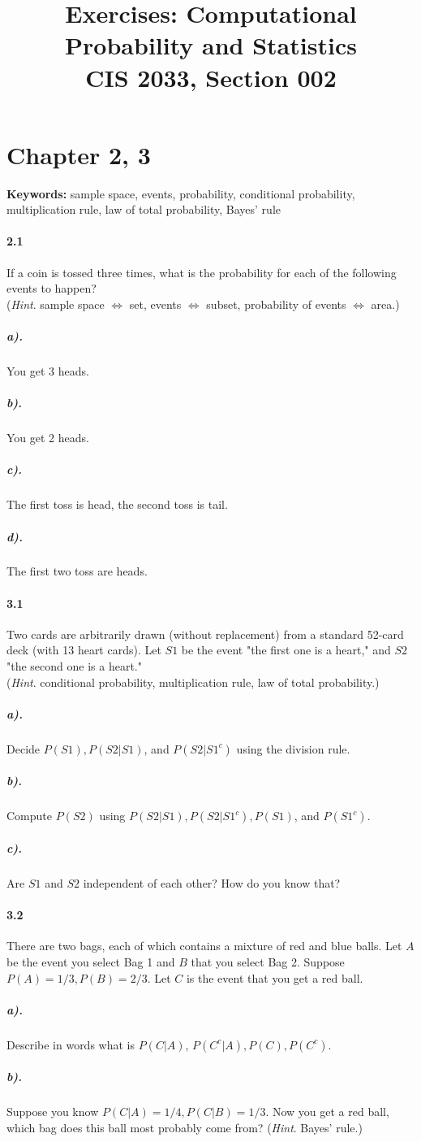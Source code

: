 \documentclass[11pt]{article} %
\title{Exercises: Computational Probability and Statistics \\
CIS 2033, Section 002}
\begin{document}
\maketitle
\section{Chapter 2, 3}
\textbf{Keywords:} sample space, events, probability, conditional probability, multiplication rule, law of total probability, Bayes' rule
\paragraph*{2.1} If a coin is tossed three times, what is the probability for each of the following events to happen?\\
(\textit{Hint}. sample space $\Leftrightarrow$ set, events $\Leftrightarrow$ subset, probability of events $\Leftrightarrow$ area.)
\subparagraph*{a).} You get 3 heads.
\subparagraph*{b).} You get 2 heads.
\subparagraph*{c).} The first toss is head, the second toss is tail.
\subparagraph*{d).} The first two toss are heads.

\paragraph*{3.1} Two cards are arbitrarily drawn (without replacement) from a standard 52-card deck (with 13 heart cards). Let $S1$ be the event "the first one is a heart," and $S2$ "the second one is a heart."\\
(\textit{Hint}. conditional probability, multiplication rule, law of total probability.)
\subparagraph*{a).} Decide $P(S1), P(S2 | S1)$, and $P(S2 | S1^c)$ using the division rule.
\subparagraph*{b).} Compute $P(S2)$ using $P(S2 | S1),  P(S2 | S1^c), P(S1)$, and $P(S1^c)$.
\subparagraph*{c).} Are $S1$ and $S2$ independent of each other? How do you know that?

\paragraph*{3.2} There are two bags, each of which contains a mixture of red and blue balls. Let $A$ be the event you select Bag 1 and $B$ that you select Bag 2.
Suppose $P(A) = 1/3, P (B) = 2/3$. Let $C$ is the event that you get a red ball. 
\subparagraph*{a).} Describe in words what is $P(C|A)$, $P(C^c|A), P(C), P(C^c)$.
\subparagraph*{b).} Suppose you know $P(C|A) = 1/4, P(C|B) = 1/3$. Now you get a red ball, which bag does this ball most probably come from?
(\textit{Hint}. Bayes' rule.)
\end{document}
